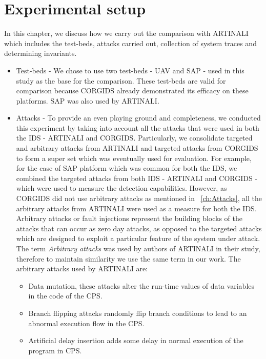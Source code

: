 \section{Experimental setup}
In this chapter, we discuss how we carry out the comparison with ARTINALI which includes the test-beds, attacks carried out, collection of system traces and determining invariants. 
\begin{itemize}
\item Test-beds - We chose to use two test-beds - \ac{UAV} and \ac{SAP} - used in this study as the base for the comparison. These test-beds are valid for comparison because \ac{CORGIDS} already demonstrated its efficacy on these platforms. \ac{SAP} was also used by ARTINALI.

\item Attacks - To provide an even playing ground and completeness, we conducted this experiment by taking into account all the attacks that were used in both the \ac{IDS} - ARTINALI and \ac{CORGIDS}. Particularly, we consolidate targeted and arbitrary attacks from ARTINALI and targeted attacks from \ac{CORGIDS} to form a super set which was eventually used for evaluation. For example, for the case of \ac{SAP} platform which was common for both the \ac{IDS}, we combined the targeted attacks from both \ac{IDS} - ARTINALI and \ac{CORGIDS} - which were used to measure the detection capabilities. However, as \ac{CORGIDS} did not use arbitrary attacks as mentioned in ~\autoref{ch:Attacks}, all the arbitrary attacks from ARTINALI were used as a measure for both the \ac{IDS}.
Arbitrary attacks or fault injections represent the building blocks of the attacks that can occur as zero day attacks, as opposed to the targeted attacks which are designed to exploit a particular feature of the system under attack. The term \textit{Arbitrary attacks} was used by authors of ARTINALI in their study, therefore to maintain similarity we use the same term in our work. The arbitrary attacks used by ARTINALI are:

\begin{itemize}
\item Data mutation, these attacks alter the run-time values of data variables in the code of the \ac{CPS}.
\item Branch flipping attacks randomly flip branch conditions to lead to an abnormal execution flow in the \ac{CPS}.
\item Artificial delay insertion adds some delay in normal execution of the program in \ac{CPS}.
\end{itemize}


\end{itemize}
